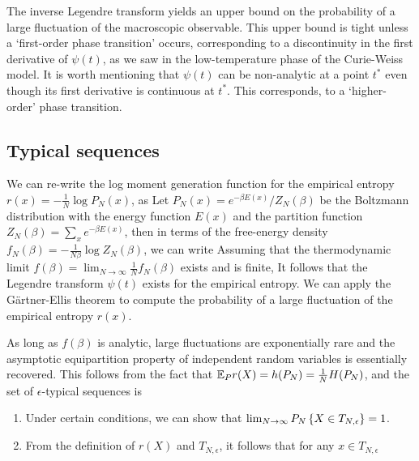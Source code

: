 \documentclass[letterpaper,english,10pt]{article}
\begin{document}
The inverse Legendre transform yields an upper bound on the probability of a large fluctuation of the macroscopic observable. 
This upper bound is tight unless a `first-order phase transition' occurs, corresponding to a discontinuity in the first derivative of $\psi(t)$, as we saw in the low-temperature phase of the Curie-Weiss model.
It is worth mentioning that $\psi(t)$ can be non-analytic at a point $t^\ast$ even though its first derivative is continuous at $t^\ast$. 
This corresponds, to a `higher-order' phase transition. 

\subsection{Typical sequences}
We can re-write the log moment generation function for the empirical entropy $r(x) = -\frac{1}{N}\log P_N(x)$, as 
Let $P_N(x) = e^{-\beta E(x)}/Z_N(\beta)$ be the Boltzmann distribution with the energy function $E(x)$ and the partition function $Z_N(\beta) = \sum_x e^{-\beta E(x)}$, 
then in terms of the free-energy density $f_N(\beta) = -\frac{1}{N\beta}\log Z_N(\beta)$, we can write  
Assuming that the thermodynamic limit $f(\beta) = \lim_{N\to\infty}\frac{1}{N}f_N(\beta)$ exists and is finite, 
It follows that the Legendre transform $\psi(t)$ exists for the empirical entropy. 
We can apply the G\"{a}rtner-Ellis theorem to compute the probability of a large fluctuation of the empirical entropy $r(x)$. 

As long as $f(\beta)$ is analytic, large fluctuations are exponentially rare and the asymptotic equipartition property of independent random variables is essentially recovered. 
This follows from the fact that $\mathbb{E}_Pr(X) = h(P_N) = \frac{1}{N}H(P_N)$, 
and the set of $\epsilon$-typical sequences is 
\begin{enumerate}
\item Under certain conditions, we can show that $\lim_{N\to\infty}P_N\left\{X \in T_{N,\epsilon}\right\} = 1$. 
\item From the definition of $r(X)$ and $T_{N,\epsilon}$, it follows that for any $x \in T_{N,\epsilon}$
\end{enumerate}
\end{document}
